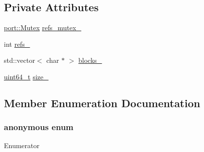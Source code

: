 \subsection*{Private Attributes}
\begin{DoxyCompactItemize}
\item 
\hyperlink{classleveldb_1_1port_1_1_mutex}{port\+::\+Mutex} \hyperlink{classleveldb_1_1anonymous__namespace_02memenv_8cc_03_1_1_file_state_a97b5df78d149a3ab3fec8a0cad5ccb6a}{refs\+\_\+mutex\+\_\+}
\item 
int \hyperlink{classleveldb_1_1anonymous__namespace_02memenv_8cc_03_1_1_file_state_aa55c9704a15e0d97fd6ce1dd6205be3e}{refs\+\_\+}
\item 
std\+::vector$<$ char $\ast$ $>$ \hyperlink{classleveldb_1_1anonymous__namespace_02memenv_8cc_03_1_1_file_state_acf8684c52d7f1182f4688f0238af0e48}{blocks\+\_\+}
\item 
\hyperlink{stdint_8h_aaa5d1cd013383c889537491c3cfd9aad}{uint64\+\_\+t} \hyperlink{classleveldb_1_1anonymous__namespace_02memenv_8cc_03_1_1_file_state_a71d1580717585cf6f85862c91c440eb3}{size\+\_\+}
\end{DoxyCompactItemize}


\subsection{Member Enumeration Documentation}
\hypertarget{classleveldb_1_1anonymous__namespace_02memenv_8cc_03_1_1_file_state_afd0441590b6ae8f2dbb319ac6c6164a8}{}\subsubsection[{anonymous enum}]{\setlength{\rightskip}{0pt plus 5cm}anonymous enum\hspace{0.3cm}{\ttfamily [private]}}\label{classleveldb_1_1anonymous__namespace_02memenv_8cc_03_1_1_file_state_afd0441590b6ae8f2dbb319ac6c6164a8}
\begin{Desc}
\item[Enumerator]\par
\begin{description}
\item[{\em 
\hypertarget{classleveldb_1_1anonymous__namespace_02memenv_8cc_03_1_1_file_state_afd0441590b6ae8f2dbb319ac6c6164a8ae7245af3268158b3af9eb81c3f0f3fee}{}k\+Block\+Size\label{classleveldb_1_1anonymous__namespace_02memenv_8cc_03_1_1_file_state_afd0441590b6ae8f2dbb319ac6c6164a8ae7245af3268158b3af9eb81c3f0f3fee}
}]\end{description}
\end{Desc}


